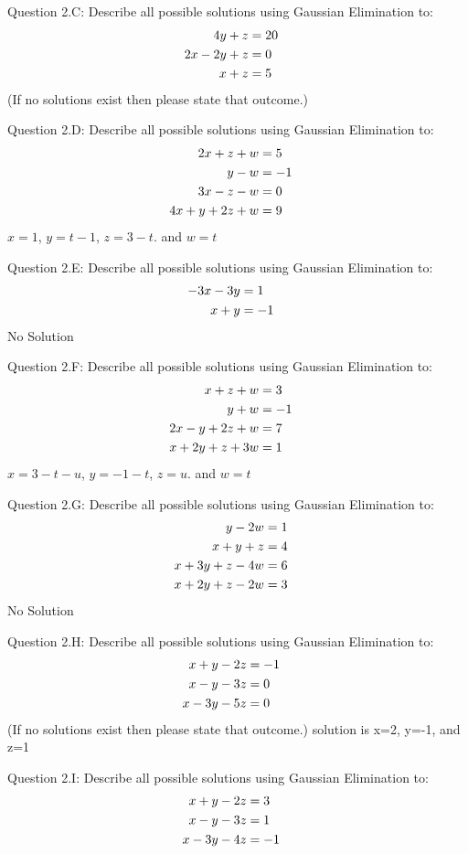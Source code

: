 \documentclass{article}
\begin{document}
\par \medskip \noindent 
%
Question 2.C: Describe all possible solutions using Gaussian Elimination to:
\begin{align*}
    4y + z &= 20 \cr 
    2x - 2y + z &= 0 \cr
    x + z &= 5
\end{align*}
(If no solutions exist then please state that outcome.)
\par \medskip \noindent 
%
Question 2.D:  Describe all possible solutions using Gaussian Elimination to:
\begin{align*}
    2x + z + w &= 5 \cr 
    y - w&= -1 \cr
    3x - z - w &= 0\cr
    4x + y + 2z + w &=9
\end{align*}
{\color{teal}$x=1$, $y=t-1$, $z=3-t$. and $w=t$}
\par \medskip \noindent 
%
Question 2.E:  Describe all possible solutions using Gaussian Elimination to:
\begin{align*}
    -3x - 3y &= 1 \cr 
      x + y &= -1
\end{align*}
{\color{teal} No Solution}
\par \medskip \noindent 
%
Question 2.F:  Describe all possible solutions using Gaussian Elimination to:
\begin{align*}
    x + z + w &= 3 \cr 
    y + w&= -1 \cr
    2x - y +2z + w &= 7\cr
    x + 2y + z + 3w &=1
\end{align*}
{\color{teal}$x=3-t-u$, $y=-1-t$, $z=u$. and $w=t$}
\par \medskip \noindent 
%
Question 2.G: Describe all possible solutions using Gaussian Elimination to:
\begin{align*}
     y - 2w &= 1 \cr 
    x + y + z  &= 4 \cr
    x + 3y + z  -4w &= 6\cr
    x + 2y + z - 2w &= 3
\end{align*}
{\color{teal}No Solution} 
\par \medskip \noindent 
%
Question 2.H: Describe all possible solutions using Gaussian Elimination to:
\begin{align*}
     x + y - 2z &= -1 \cr 
    x - y -3z  &= 0 \cr
    x - 3y -5 z  &= 0 
\end{align*}
(If no solutions exist then please state that outcome.) {\color{teal} solution is x=2, y=-1, and z=1}
\par \medskip \noindent 
%
Question 2.I: Describe all possible solutions using Gaussian Elimination to:
\begin{align*}
     x + y - 2z &= 3 \cr 
    x - y -3z  &= 1 \cr
    x - 3y -4 z  &= -1 
\end{align*}
\end{document}
